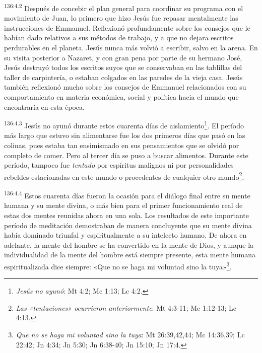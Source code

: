 \par
\textsuperscript{136:4.2} Después de concebir el plan general para coordinar su programa con el movimiento de Juan, lo primero que hizo Jesús fue repasar mentalmente las instrucciones de Emmanuel. Reflexionó profundamente sobre los consejos que le habían dado relativos a sus métodos de trabajo, y a que no dejara escritos perdurables en el planeta. Jesús nunca más volvió a escribir, salvo en la arena. En su visita posterior a Nazaret, y con gran pena por parte de su hermano José, Jesús destruyó todos los escritos suyos que se conservaban en las tablillas del taller de carpintería, o estaban colgados en las paredes de la vieja casa. Jesús también reflexionó mucho sobre los consejos de Emmanuel relacionados con su comportamiento en materia económica, social y política hacia el mundo que encontraría en esta época.

\par
\textsuperscript{136:4.3} Jesús no ayunó durante estos cuarenta días de aislamiento\footnote{\textit{Jesús no ayunó}: Mt 4:2; Mc 1:13; Lc 4:2.}. El período más largo que estuvo sin alimentarse fue los dos primeros días que pasó en las colinas, pues estaba tan ensimismado en sus pensamientos que se olvidó por completo de comer. Pero al tercer día se puso a buscar alimentos. Durante este período, tampoco fue \textit{tentado} por espíritus malignos ni por personalidades rebeldes estacionadas en este mundo o procedentes de cualquier otro mundo\footnote{\textit{Las «tentaciones» ocurrieron anteriormente}: Mt 4:3-11; Mc 1:12-13; Lc 4:13.}.

\par
\textsuperscript{136:4.4} Estos cuarenta días fueron la ocasión para el diálogo final entre su mente humana y su mente divina, o más bien para el primer funcionamiento real de estas dos mentes reunidas ahora en una sola. Los resultados de este importante período de meditación demostraban de manera concluyente que su mente divina había dominado triunfal y espiritualmente a su intelecto humano. De ahora en adelante, la mente del hombre se ha convertido en la mente de Dios, y aunque la individualidad de la mente del hombre está siempre presente, esta mente humana espiritualizada dice siempre: «Que no se haga mi voluntad sino la tuya»\footnote{\textit{Que no se haga mi voluntad sino la tuya}: Mt 26:39,42,44; Mc 14:36,39; Lc 22:42; Jn 4:34; Jn 5:30; Jn 6:38-40; Jn 15:10; Jn 17:4.}.

